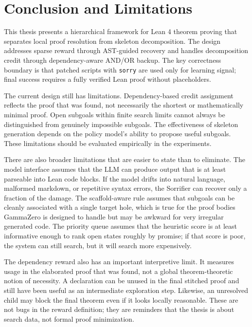 \chapter{Conclusion and Limitations}
\label{sec:conclusion}

This thesis presents a hierarchical framework for Lean 4 theorem proving that separates local proof resolution from skeleton decomposition. The design addresses sparse reward through AST-guided recovery and handles decomposition credit through dependency-aware AND/OR backup. The key correctness boundary is that patched scripts with \texttt{sorry} are used only for learning signal; final success requires a fully verified Lean proof without placeholders.

The current design still has limitations. Dependency-based credit assignment reflects the proof that was found, not necessarily the shortest or mathematically minimal proof. Open subgoals within finite search limits cannot always be distinguished from genuinely impossible subgoals. The effectiveness of skeleton generation depends on the policy model's ability to propose useful subgoals. These limitations should be evaluated empirically in the experiments.

There are also broader limitations that are easier to state than to eliminate. The model interface assumes that the LLM can produce output that is at least parseable into Lean code blocks. If the model drifts into natural language, malformed markdown, or repetitive syntax errors, the Sorrifier can recover only a fraction of the damage. The scaffold-aware rule assumes that subgoals can be cleanly associated with a single target hole, which is true for the proof bodies GammaZero is designed to handle but may be awkward for very irregular generated code. The priority queue assumes that the heuristic score is at least informative enough to rank open states roughly by promise; if that score is poor, the system can still search, but it will search more expensively.

The dependency reward also has an important interpretive limit. It measures usage in the elaborated proof that was found, not a global theorem-theoretic notion of necessity. A declaration can be unused in the final stitched proof and still have been useful as an intermediate exploration step. Likewise, an unresolved child may block the final theorem even if it looks locally reasonable. These are not bugs in the reward definition; they are reminders that the thesis is about search data, not formal proof minimization.

